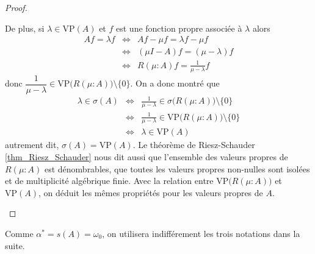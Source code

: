 \begin{proof}
\begin{itemize}
        De plus, si $\lambda \in \mathrm{VP}(A)$ et $f$ est une fonction propre associée à $\lambda$ alors 
        \begin{eqnarray*}
            Af = \lambda f &\iff& Af - \mu f = \lambda f - \mu f \\
            &\iff& (\mu I - A)f = (\mu - \lambda)f \\
            &\iff& R(\mu : A)f = \frac{1}{\mu - \lambda}f
        \end{eqnarray*}
        donc $\dfrac{1}{\mu-\lambda} \in \mathrm{VP}\big(R(\mu : A)\big) \setminus \{0\}$. On a donc montré que 
        \begin{eqnarray*}
            \lambda \in \sigma(A) &\iff& \frac{1}{\mu-\lambda} \in \sigma\big(R(\mu : A)\big) \setminus\{0\} \\
            &\iff& \frac{1}{\mu-\lambda} \in \mathrm{VP}\big(R(\mu: A)\big) \setminus \{0\} \\
            &\iff& \lambda \in \mathrm{VP}(A)
        \end{eqnarray*}
        autrement dit, $\sigma(A) = \mathrm{VP}(A)$. Le théorème de Riesz-Schauder \ref{thm_Riesz_Schauder} nous dit aussi que l'ensemble des valeurs propres de $R(\mu : A)$ est dénombrables, que toutes les valeurs propres non-nulles sont isolées et de multiplicité algébrique finie. Avec la relation entre $\mathrm{VP}\big(R(\mu: A)\big)$ et $\mathrm{VP}(A)$, on déduit les mêmes propriétés pour les valeurs propres de $A$.
    \end{itemize}
\end{proof}

\begin{remark}
    Comme $\alpha^*=s(A)=\omega_0$, on utilisera indifférement les trois notations dans la suite.
\end{remark}

